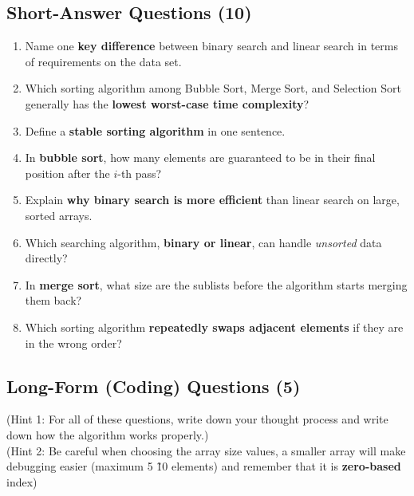 \documentclass[a4paper,12pt]{article}
\begin{document}
\vspace{1em}
\subsection{Short-Answer Questions (10)}

\begin{enumerate}
  \item Name one \textbf{key difference} between binary search and linear search in terms of requirements on the data set.

  \item Which sorting algorithm among Bubble Sort, Merge Sort, and Selection Sort generally has the \textbf{lowest worst-case time complexity}?

  \item Define a \textbf{stable sorting algorithm} in one sentence.

  \item In \textbf{bubble sort}, how many elements are guaranteed to be in their final position after the \(i\)-th pass?

  \item Explain \textbf{why binary search is more efficient} than linear search on large, sorted arrays.

  \item Which searching algorithm, \textbf{binary or linear}, can handle \emph{unsorted} data directly?

  \item In \textbf{merge sort}, what size are the sublists before the algorithm starts merging them back?
  
  \item Which sorting algorithm \textbf{repeatedly swaps adjacent elements} if they are in the wrong order?
\end{enumerate}

\vspace{1em}

\newpage

\subsection{Long-Form (Coding) Questions (5)}

\begin{center}
    (Hint 1: For all of these questions, write down your thought process and write down how the algorithm works properly.)\\
    (Hint 2: Be careful when choosing the array size values, a smaller array will make debugging easier (maximum 5 \~ 10 elements) and remember that it is \textbf{zero-based} index)
\end{center}
\end{document}
